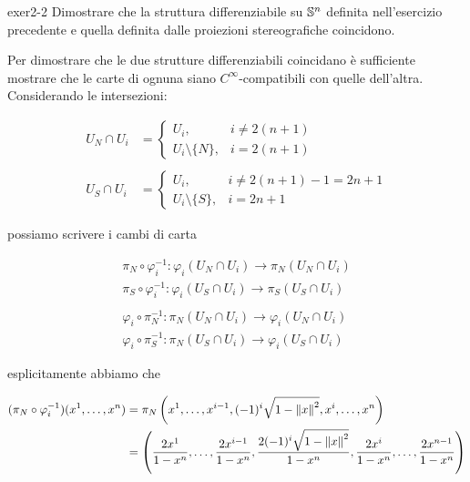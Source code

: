 
{exer2-2}
{
Dimostrare che la struttura differenziabile su $ \S^{n} $ definita nell’esercizio precedente e quella definita dalle proiezioni stereografiche coincidono.
}
{
Per dimostrare che le due strutture differenziabili coincidano è sufficiente mostrare che le carte di ognuna siano $ C^{\infty} $-compatibili con quelle dell'altra. \\
Considerando le intersezioni:

\begin{align}
	U_{N} \cap U_{i} &= %
	\begin{cases}
		U_{i}, & i \neq 2(n+1) \\
		U_{i} \setminus \{ N \}, & i = 2(n+1)
	\end{cases} \\
	\nonumber \\
	U_{S} \cap U_{i} &= %
	\begin{cases}
		U_{i}, & i \neq 2(n+1) - 1 = 2 n + 1 \\
		U_{i} \setminus \{ S \}, & i = 2n+1
	\end{cases}
\end{align}

possiamo scrivere i cambi di carta

\begin{gather}
	\pi_{N} \circ \varphi_{i}^{-1} : \varphi_{i}(U_{N} \cap U_{i}) \to \pi_{N}(U_{N} \cap U_{i}) \\
	\pi_{S} \circ \varphi_{i}^{-1} : \varphi_{i}(U_{S} \cap U_{i}) \to \pi_{S}(U_{S} \cap U_{i}) \\
	\nonumber \\
	\varphi_{i} \circ \pi_{N}^{-1} : \pi_{N}(U_{N} \cap U_{i}) \to \varphi_{i}(U_{N} \cap U_{i}) \\
	\varphi_{i} \circ \pi_{S}^{-1} : \pi_{N}(U_{S} \cap U_{i}) \to \varphi_{i}(U_{S} \cap U_{i})
\end{gather}

esplicitamente abbiamo che

\begin{align}
	\begin{split}
		(\pi_{N} \circ \varphi_{i}^{-1})(x^{1},\dots,x^{n}) &= \pi_{N} \left( x^{1}, \dots, x^{i-1}, (-1)^{i} \sqrt{1 - \norm{x}^{2}}, x^{i}, \dots, x^{n} \right) \\
		&= \left( \dfrac{2 x^{1}}{1-x^{n}}, \dots, \dfrac{2 x^{i-1}}{1-x^{n}}, \dfrac{2 (-1)^{i} \sqrt{1 - \norm{x}^{2}}}{1-x^{n}}, \dfrac{2 x^{i}}{1-x^{n}}, \dots, \dfrac{2 x^{n-1}}{1-x^{n}} \right)
	\end{split}
\end{align}

}
